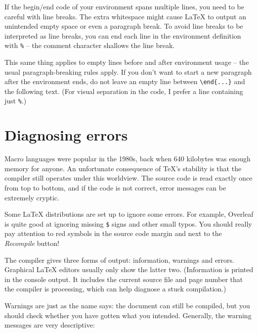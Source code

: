\begin{gotcha}
If the begin/end code of your environment spans multiple lines,
you need to be careful with line breaks.
The extra whitespace might cause \LaTeX{} to output an unintended empty space
or even a paragraph break.
To avoid line breaks to be interpreted as line breaks,
you can end each line in the environment definition with \verb|%|
-- the comment character shallows the line break.

This same thing applies to empty lines before and after environment usage
-- the usual paragraph-breaking rules apply.
If you don't want to start a new paragraph after the environment ends,
do not leave an empty line between \verb|\end{...}| and the following text.
(For visual separation in the code, I prefer a line containing just \verb|%|.)
\end{gotcha}




%
%
%
\section{Diagnosing errors}

Macro languages were popular in the 1980s, back when 640 kilobytes was enough memory for anyone.
An unfortunate consequence of \TeX's stability is that the compiler still operates under this worldview.
The source code is read exactly once from top to bottom,
and if the code is not correct, error messages can be extremely cryptic.

\begin{overleaf}
Some \LaTeX{} distributions are set up to ignore some errors.
For example, Overleaf is quite good at ignoring missing \verb|$| signs and other small typos.
You should really pay attention to red symbols in the source code margin
and next to the \emph{Recompile} button!
\end{overleaf}

The compiler gives three forms of output: information, warnings and errors.
Graphical \LaTeX{} editors usually only show the latter two.
(Information is printed in the console output.
It includes the current source file and page number that the compiler is processing,
which can help diagnose a stuck compilation.)

Warnings are just as the name says: the document can still be compiled,
but you should check whether you have gotten what you intended.
Generally, the warning messages are very descriptive:

